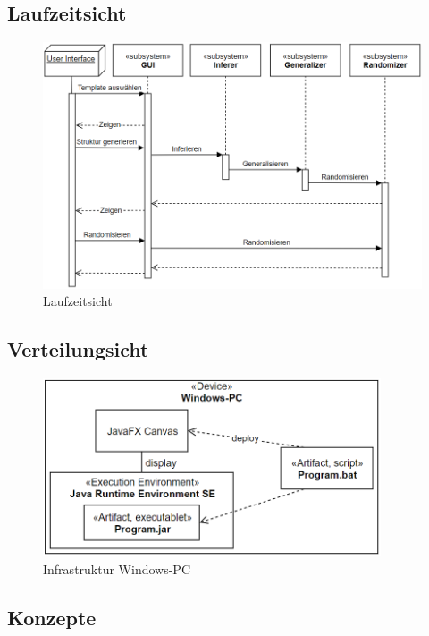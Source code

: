 \documentclass[11pt]{article}
\begin{document}
    \subsection{Laufzeitsicht}
    \begin{figure}[H]
        \centering
        \includegraphics[width=14cm]{../images/Laufzeitsicht.PNG}
        \caption{Laufzeitsicht}
    \end{figure}

    \subsection{Verteilungsicht}
    \begin{figure}[H]
        \centering
        \includegraphics[width=10cm]{../images/Verteilungssicht.PNG}
        \caption{Infrastruktur Windows-PC}
    \end{figure}

    \subsection{Konzepte}
\end{document}
